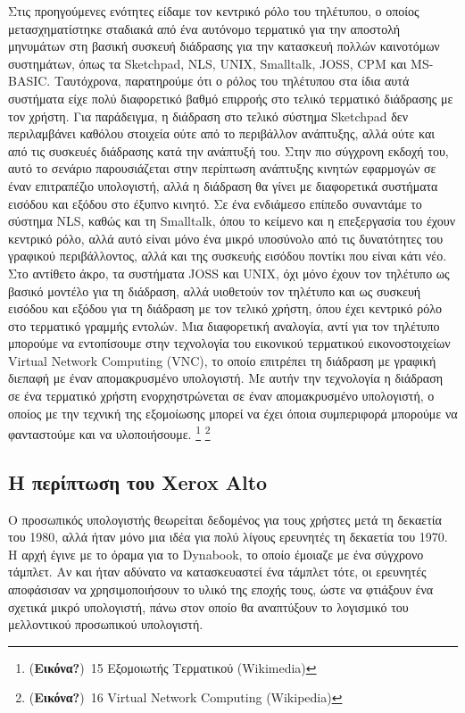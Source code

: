 \documentclass[
]{article}
\begin{document}
Στις προηγούμενες ενότητες είδαμε τον κεντρικό ρόλο του τηλέτυπου, ο
οποίος μετασχηματίστηκε σταδιακά από ένα αυτόνομο τερματικό για την
αποστολή μηνυμάτων στη βασική συσκευή διάδρασης για την κατασκευή πολλών
καινοτόμων συστημάτων, όπως τα Sketchpad, NLS, UNIX, Smalltalk, JOSS,
CPM και MS-BASIC. Ταυτόχρονα, παρατηρούμε ότι ο ρόλος του τηλέτυπου στα
ίδια αυτά συστήματα είχε πολύ διαφορετικό βαθμό επιρροής στο τελικό
τερματικό διάδρασης με τον χρήστη. Για παράδειγμα, η διάδραση στο τελικό
σύστημα Sketchpad δεν περιλαμβάνει καθόλου στοιχεία ούτε από το
περιβάλλον ανάπτυξης, αλλά ούτε και από τις συσκευές διάδρασης κατά την
ανάπτυξή του. Στην πιο σύγχρονη εκδοχή του, αυτό το σενάριο
παρουσιάζεται στην περίπτωση ανάπτυξης κινητών εφαρμογών σε έναν
επιτραπέζιο υπολογιστή, αλλά η διάδραση θα γίνει με διαφορετικά
συστήματα εισόδου και εξόδου στο έξυπνο κινητό. Σε ένα ενδιάμεσο επίπεδο
συναντάμε το σύστημα NLS, καθώς και τη Smalltalk, όπου το κείμενο και η
επεξεργασία του έχουν κεντρικό ρόλο, αλλά αυτό είναι μόνο ένα μικρό
υποσύνολο από τις δυνατότητες του γραφικού περιβάλλοντος, αλλά και της
συσκευής εισόδου ποντίκι που είναι κάτι νέο. Στο αντίθετο άκρο, τα
συστήματα JOSS και UNIX, όχι μόνο έχουν τον τηλέτυπο ως βασικό μοντέλο
για τη διάδραση, αλλά υιοθετούν τον τηλέτυπο και ως συσκευή εισόδου και
εξόδου για τη διάδραση με τον τελικό χρήστη, όπου έχει κεντρικό ρόλο στο
τερματικό γραμμής εντολών. Μια διαφορετική αναλογία, αντί για τον
τηλέτυπο μπορούμε να εντοπίσουμε στην τεχνολογία του εικονικού
τερματικού εικονοστοιχείων Virtual Network Computing (VNC), το οποίο
επιτρέπει τη διάδραση με γραφική διεπαφή με έναν απομακρυσμένο
υπολογιστή. Με αυτήν την τεχνολογία η διάδραση σε ένα τερματικό χρήστη
ενορχηστρώνεται σε έναν απομακρυσμένο υπολογιστή, ο οποίος με την
τεχνική της εξομοίωσης μπορεί να έχει όποια συμπεριφορά μπορούμε να
φανταστούμε και να υλοποιήσουμε. \footnote{(\textbf{Εικόνα?})~15
  Εξομοιωτής Τερματικού (Wikimedia)} \footnote{(\textbf{Εικόνα?})~16
  Virtual Network Computing (Wikipedia)}

\hypertarget{ux3b7-ux3c0ux3b5ux3c1ux3afux3c0ux3c4ux3c9ux3c3ux3b7-ux3c4ux3bfux3c5-xerox-alto}{%
\subsection{Η περίπτωση του Xerox
Alto}\label{ux3b7-ux3c0ux3b5ux3c1ux3afux3c0ux3c4ux3c9ux3c3ux3b7-ux3c4ux3bfux3c5-xerox-alto}}

Ο προσωπικός υπολογιστής θεωρείται δεδομένος για τους χρήστες μετά τη
δεκαετία του 1980, αλλά ήταν μόνο μια ιδέα για πολύ λίγους ερευνητές τη
δεκαετία του 1970. Η αρχή έγινε με το όραμα για το Dynabook, το οποίο
έμοιαζε με ένα σύγχρονο τάμπλετ. Αν και ήταν αδύνατο να κατασκευαστεί
ένα τάμπλετ τότε, οι ερευνητές αποφάσισαν να χρησιμοποιήσουν το υλικό
της εποχής τους, ώστε να φτιάξουν ένα σχετικά μικρό υπολογιστή, πάνω
στον οποίο θα αναπτύξουν το λογισμικό του μελλοντικού προσωπικού
υπολογιστή.
\end{document}
